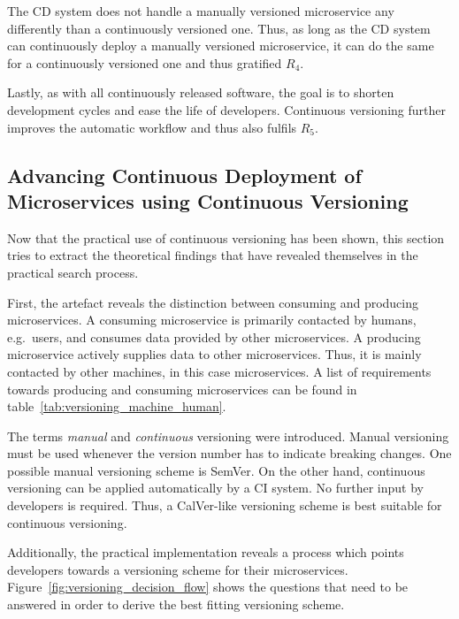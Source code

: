 The \ac{CD} system does not handle a manually versioned microservice any
differently than a continuously versioned one. Thus, as long as the \ac{CD}
system can continuously deploy a manually versioned microservice, it can do the
same for a continuously versioned one and thus gratified $R_4$.

Lastly, as with all continuously released software, the goal is to shorten
development cycles and ease the life of developers. Continuous versioning
further improves the automatic workflow and thus also fulfils $R_5$.

\subsection{Advancing Continuous Deployment of Microservices using Continuous Versioning}%
\label{sub:Advancing_Continuous_Deployment_of_Microservices_using_XXX_Versioning}
Now that the practical use of continuous versioning has been shown, this
section tries to extract the theoretical findings that have revealed themselves
in the practical search process.

First, the artefact reveals the distinction between consuming and producing
microservices. A consuming microservice is primarily contacted by humans, e.g.\
users, and consumes data provided by other microservices. A producing
microservice actively supplies data to other microservices. Thus, it is mainly
contacted by other machines, in this case microservices. A list of requirements
towards producing and consuming microservices can be found in
table~\ref{tab:versioning_machine_human}.

The terms \textit{manual} and \textit{continuous} versioning were introduced.
Manual versioning must be used whenever the version number has to indicate
breaking changes. One possible manual versioning scheme is SemVer. On the other
hand, continuous versioning can be applied automatically by a \ac{CI} system.
No further input by developers is required. Thus, a CalVer-like versioning
scheme is best suitable for continuous versioning.

Additionally, the practical implementation reveals a process which points
developers towards a versioning scheme for their microservices.
Figure~\ref{fig:versioning_decision_flow} shows the questions that need to be
answered in order to derive the best fitting versioning scheme.

